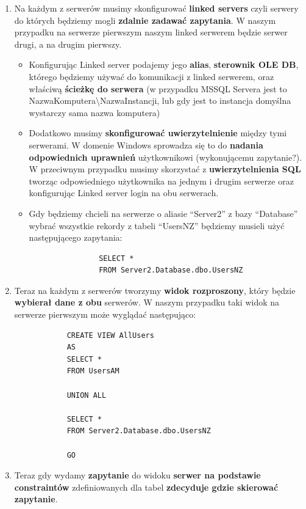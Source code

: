\documentclass[a4paper]{article}
\begin{document}
\begin{enumerate}
        \item Na każdym z serwerów musimy skonfigurować \textbf{linked servers} czyli serwery do których będziemy
        mogli \textbf{zdalnie zadawać zapytania}. W naszym przypadku na serwerze pierwszym naszym linked serwerem
        będzie serwer drugi, a na drugim pierwszy.
        \begin{itemize}[noitemsep]
            \item Konfigurując Linked server podajemy jego \textbf{alias}, \textbf{sterownik OLE DB}, którego będziemy
            używać do komunikacji z linked serwerem, oraz właściwą \textbf{ścieżkę do serwera} (w przypadku MSSQL
            Servera jest to NazwaKomputera\textbackslash NazwaInstancji, lub gdy jest to instancja domyślna wystarczy
            sama nazwa komputera)
            \item Dodatkowo musimy \textbf{skonfigurować uwierzytelnienie} między tymi serwerami. W domenie Windows
            sprowadza się to do \textbf{nadania odpowiednich uprawnień} użytkownikowi (wykonującemu zapytanie?). W
            przeciwnym przypadku musimy skorzystać z \textbf{uwierzytelnienia SQL} tworząc odpowiedniego
            użytkownika na jednym i drugim serwerze oraz konfigurując Linked server login na obu serwerach.
            \item Gdy będziemy chcieli na serwerze o aliasie ``Server2'' z bazy ``Database'' wybrać wszystkie rekordy
            z tabeli ``UsersNZ'' będziemy musieli użyć następującego zapytania:
            \begin{verbatim}
                SELECT *
                FROM Server2.Database.dbo.UsersNZ
            \end{verbatim}
        \end{itemize}

        \item Teraz na każdym z serwerów tworzymy \textbf{widok rozproszony}, który będzie \textbf{wybierał dane z obu}
        serwerów. W naszym przypadku taki widok na serwerze pierwszym może wyglądać następująco:
        \begin{verbatim}
            CREATE VIEW AllUsers
            AS
            SELECT *
            FROM UsersAM

            UNION ALL

            SELECT *
            FROM Server2.Database.dbo.UsersNZ

            GO
        \end{verbatim}

        \item Teraz gdy wydamy \textbf{zapytanie} do widoku \textbf{serwer na podstawie constraintów} zdefiniowanych
        dla tabel \textbf{zdecyduje gdzie skierować zapytanie}.
    \end{enumerate}
\end{document}
